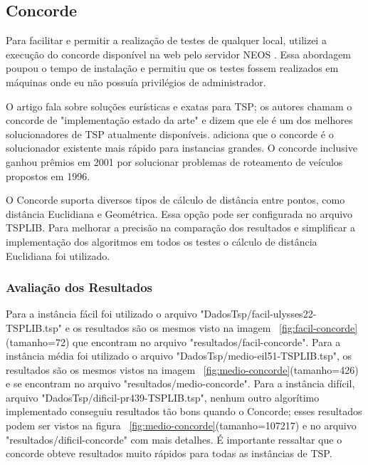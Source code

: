 \documentclass{acm_proc_article-sp}
\begin{document}
\subsection{Concorde}
Para facilitar e permitir a realização de testes de qualquer local, utilizei a execução do concorde disponível na web pelo servidor NEOS \cite{concorde}. Essa abordagem poupou o tempo de instalação e permitiu que os testes fossem realizados em máquinas onde eu não possuía privilégios de administrador.

O artigo \cite{Hornik2007}  fala sobre soluções eurísticas e exatas para TSP; os autores chamam o concorde de "implementação estado da arte"  e dizem que ele é um dos melhores solucionadores de TSP atualmente disponíveis. \cite{Samuel2003} adiciona que o concorde é o solucionador existente mais rápido para instancias grandes. O concorde inclusive ganhou prêmios em 2001 por solucionar problemas de roteamento de veículos propostos em 1996.

O Concorde suporta diversos tipos de cálculo de distância entre pontos, como distância Euclidiana e Geométrica. Essa opção pode ser configurada no arquivo TSPLIB. Para melhorar a precisão na comparação dos resultados e simplificar a implementação dos algoritmos em todos os testes o cálculo de distância Euclidiana foi utilizado.

\subsubsection{Avaliação dos Resultados}
Para a instância fácil foi utilizado o arquivo "DadosTsp/facil-ulysses22-TSPLIB.tsp" e os resultados são os mesmos visto na imagem ~\ref{fig:facil-concorde} (tamanho=72) que encontram no arquivo "resultados/facil-concorde". Para a instância média foi utilizado o arquivo "DadosTsp/medio-eil51-TSPLIB.tsp", os resultados são os mesmos vistos na imagem ~\ref{fig:medio-concorde}(tamanho=426) e se encontram no arquivo "resultados/medio-concorde". Para a instância difícil, arquivo "DadosTsp/dificil-pr439-TSPLIB.tsp", nenhum outro algorítimo implementado conseguiu resultados tão bons quando o Concorde; esses resultados podem ser vistos na figura ~\ref{fig:medio-concorde}(tamanho=107217) e no arquivo "resultados/dificil-concorde" com mais detalhes. É importante ressaltar que o concorde obteve resultados muito rápidos para todas as instâncias de TSP.
\end{document}
